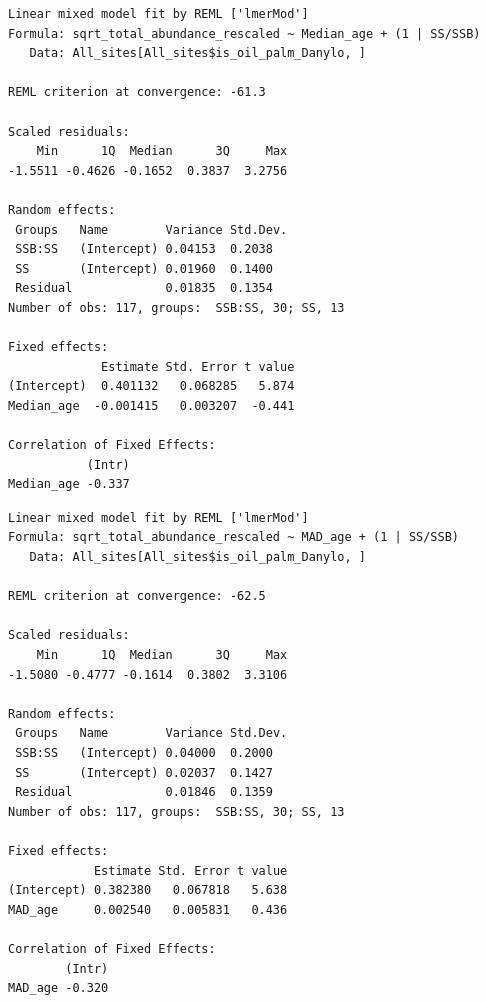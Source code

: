 \documentclass[
  letterpaper,
  DIV=11,
  numbers=noendperiod]{scrartcl}
\newenvironment{Shaded}{\begin{snugshade}}{\end{snugshade}}
\newcommand{\AttributeTok}[1]{\textcolor[rgb]{0.40,0.45,0.13}{#1}}
\newcommand{\DecValTok}[1]{\textcolor[rgb]{0.68,0.00,0.00}{#1}}
\newcommand{\FunctionTok}[1]{\textcolor[rgb]{0.28,0.35,0.67}{#1}}
\newcommand{\NormalTok}[1]{\textcolor[rgb]{0.00,0.23,0.31}{#1}}
\newcommand{\SpecialCharTok}[1]{\textcolor[rgb]{0.37,0.37,0.37}{#1}}
\begin{document}
\begin{verbatim}
Linear mixed model fit by REML ['lmerMod']
Formula: sqrt_total_abundance_rescaled ~ Median_age + (1 | SS/SSB)
   Data: All_sites[All_sites$is_oil_palm_Danylo, ]

REML criterion at convergence: -61.3

Scaled residuals: 
    Min      1Q  Median      3Q     Max 
-1.5511 -0.4626 -0.1652  0.3837  3.2756 

Random effects:
 Groups   Name        Variance Std.Dev.
 SSB:SS   (Intercept) 0.04153  0.2038  
 SS       (Intercept) 0.01960  0.1400  
 Residual             0.01835  0.1354  
Number of obs: 117, groups:  SSB:SS, 30; SS, 13

Fixed effects:
             Estimate Std. Error t value
(Intercept)  0.401132   0.068285   5.874
Median_age  -0.001415   0.003207  -0.441

Correlation of Fixed Effects:
           (Intr)
Median_age -0.337
\end{verbatim}

\begin{Shaded}
\end{Shaded}

\begin{verbatim}
Linear mixed model fit by REML ['lmerMod']
Formula: sqrt_total_abundance_rescaled ~ MAD_age + (1 | SS/SSB)
   Data: All_sites[All_sites$is_oil_palm_Danylo, ]

REML criterion at convergence: -62.5

Scaled residuals: 
    Min      1Q  Median      3Q     Max 
-1.5080 -0.4777 -0.1614  0.3802  3.3106 

Random effects:
 Groups   Name        Variance Std.Dev.
 SSB:SS   (Intercept) 0.04000  0.2000  
 SS       (Intercept) 0.02037  0.1427  
 Residual             0.01846  0.1359  
Number of obs: 117, groups:  SSB:SS, 30; SS, 13

Fixed effects:
            Estimate Std. Error t value
(Intercept) 0.382380   0.067818   5.638
MAD_age     0.002540   0.005831   0.436

Correlation of Fixed Effects:
        (Intr)
MAD_age -0.320
\end{verbatim}
\end{document}
